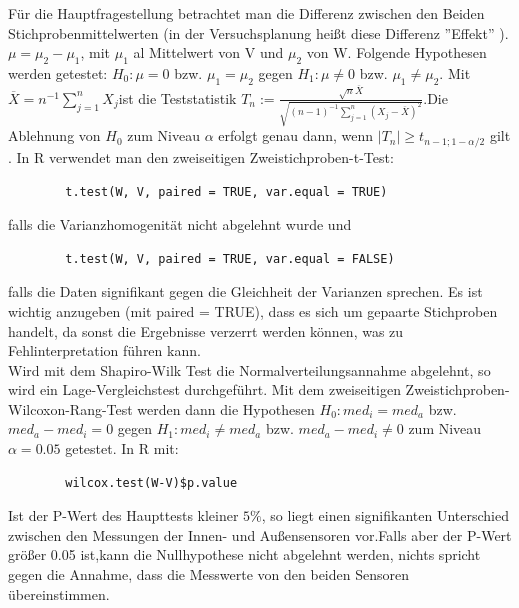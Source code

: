 \documentclass[ ngerman, fontsize= 12pt, paper=a4, headings=big, titlepage=true]{article}
\begin{document}
	Für die Hauptfragestellung betrachtet man die Differenz zwischen den Beiden Stichprobenmittelwerten (in der Versuchsplanung heißt diese Differenz ''Effekt'' \cite{1}).
	$\mu = \mu_2 - \mu_1 $, mit $ \mu_1 $ al Mittelwert von V und $ \mu_2 $ von W. Folgende Hypothesen werden getestet:
	$ H_0: \mu = 0 $ bzw. $ \mu_1 = \mu_2 $ gegen $ H_1: \mu \neq 0 $ bzw. $ \mu_1 \neq \mu_2 $. Mit $ \overline{X}= n^{-1}\sum^n_{j=1}X_j $ist die Teststatistik 
	$ T_n := \frac{\sqrt{n}\overline{X}}{\sqrt{(n-1)^{-1}\sum^n_{j = 1} (X_j - \overline{X}) ^2}} $.Die Ablehnung von $H_0 $ zum Niveau $\alpha $ erfolgt genau dann, wenn $ |T_n| \geq t_{n-1;1-\alpha/2} $ gilt \cite{2}. In R verwendet man den zweiseitigen Zweistichproben-t-Test: 
	\begin{lstlisting}
		t.test(W, V, paired = TRUE, var.equal = TRUE)
	\end{lstlisting}
	falls die Varianzhomogenität nicht abgelehnt wurde und 
	\begin{lstlisting}
		t.test(W, V, paired = TRUE, var.equal = FALSE)
	\end{lstlisting} falls die Daten signifikant gegen die Gleichheit der Varianzen sprechen. Es ist wichtig anzugeben (mit paired = TRUE), dass es sich um gepaarte Stichproben handelt, da sonst die Ergebnisse verzerrt werden können, was zu Fehlinterpretation führen kann.\\
	Wird mit dem Shapiro-Wilk Test die Normalverteilungsannahme abgelehnt, so wird ein Lage-Vergleichstest durchgeführt. Mit dem zweiseitigen Zweistichproben-Wilcoxon-Rang-Test werden dann die Hypothesen $ H_0: med_i = med_a $ bzw. $ med_a - med_i = 0 $ gegen $H_1: med_i \neq med_a $ bzw. $ med_a - med_i \neq 0 $ zum Niveau $\alpha = 0.05 $ getestet. In R mit: \begin{lstlisting}
		wilcox.test(W-V)$p.value
	\end{lstlisting}
	Ist der P-Wert des Haupttests kleiner $5\% $, so liegt einen signifikanten Unterschied zwischen den Messungen der Innen- und Außensensoren vor.Falls aber der P-Wert größer 0.05 ist,kann die Nullhypothese nicht abgelehnt werden, nichts spricht gegen die Annahme, dass die Messwerte von den beiden Sensoren übereinstimmen. \\
\end{document}
